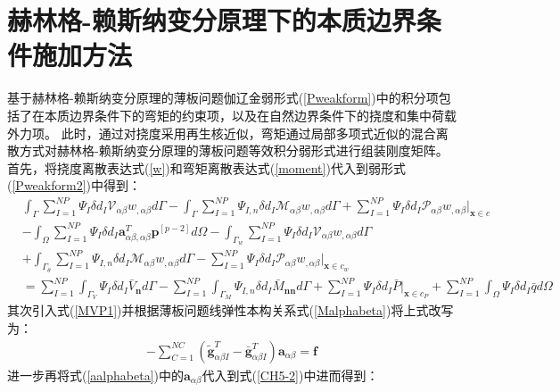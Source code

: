 \section{赫林格-赖斯纳变分原理下的本质边界条件施加方法}
基于赫林格-赖斯纳变分原理的薄板问题伽辽金弱形式(\ref{Pweakform})中的积分项包括了在本质边界条件下的弯矩的约束项，以及在自然边界条件下的挠度和集中荷载外力项。
此时，通过对挠度采用再生核近似，弯矩通过局部多项式近似的混合离散方式对赫林格-赖斯纳变分原理的薄板问题等效积分弱形式进行组装刚度矩阵。
首先，将挠度离散表达式(\ref{w})和弯矩离散表达式(\ref{moment})代入到弱形式(\ref{Pweakform2})中得到：
\begin{equation}\label{CH5-1}
\begin{split}
    &\int_{\Gamma}\sum_{I=1}^{N\!P}\Psi_I\delta{d_I}\mathcal{V}_{\alpha\beta}w_{,\alpha\beta}d\Gamma-\int_{\Gamma}\sum_{I=1}^{N\!P}\Psi_{I,n}\delta{d_I}\mathcal{M}_{\alpha\beta}w_{,\alpha\beta}d\Gamma+\sum_{I=1}^{N\!P}\Psi_I\delta{d_I}\mathcal{P}_{\alpha\beta}w_{,\alpha\beta}\vert_{\pmb{x}\in c}\\
    &-\int_{\Omega}\sum_{I=1}^{N\!P}\Psi_I\delta{d_I}\pmb{a}^T_{\alpha\beta,\alpha\beta}\pmb{p}^{[p-2]}d\Omega-\int_{\Gamma_w}\sum_{I=1}^{N\!P}\Psi_I\delta{d_I}\mathcal{V}_{\alpha\beta}w_{,\alpha\beta}d\Gamma\\
    &+\int_{\Gamma_{\theta}}\sum_{I=1}^{N\!P}\Psi_{I,n}\delta{d_I}\mathcal{M}_{\alpha\beta}w_{,\alpha\beta}d\Gamma
    -\sum_{I=1}^{N\!P}\Psi_I\delta{d_I}\mathcal{P}_{\alpha\beta}w_{,\alpha\beta}\vert_{\pmb{x}\in c_w}\\
    &=\sum_{I=1}^{N\!P}\int_{\Gamma_V}\Psi_I\delta{d_I}\bar{V}_{\pmb n}d\Gamma-\sum_{I=1}^{N\!P}\int_{\Gamma_M}\Psi_{I,n}\delta{d_I}\bar{M}_{\pmb{nn}}d\Gamma
    +\sum_{I=1}^{N\!P}\Psi_I\delta{d_I}\bar{P}\vert_{\pmb{x}\in{c_P}}+\sum_{I=1}^{N\!P}\int_{\Omega}\Psi_I\delta{d_I}\bar{q}d\Omega
\end{split}
\end{equation}
其次引入式(\ref{MVP1})并根据薄板问题线弹性本构关系式(\ref{Malphabeta})将上式改写为：
\begin{equation}\label{CH5-2}
\begin{split}
  -\sum_{C=1}^{N\!C}(\tilde{\pmb g}_{\alpha\beta I}^T-\bar{\pmb g}_{\alpha\beta I}^T)\pmb a_{\alpha\beta}=\pmb{f}
\end{split}
\end{equation}
进一步再将式(\ref{aalphabeta})中的$\pmb{a}_{\alpha\beta}$代入到式(\ref{CH5-2})中进而得到：
